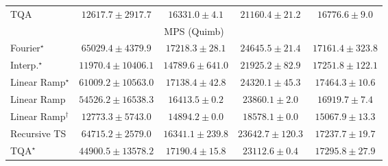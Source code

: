 \begin{tabular}{l|cccc|}
TQA & {\cellcolor[HTML]{D7E5F0}} \color[HTML]{000000} $12617.7\pm 2917.7$ & {\cellcolor[HTML]{CBDCEB}} \color[HTML]{000000} $16331.0\pm 4.1$ & {\cellcolor[HTML]{BCD1E5}} \color[HTML]{000000} $21160.4\pm 21.2$ & {\cellcolor[HTML]{C9DBEA}} \color[HTML]{000000} $16776.6\pm 9.0$ \\
\cline{1-5}
\multicolumn{5}{c}{\rule{0pt}{8pt}MPS (Quimb)} \\
\midrule
Fourier$^\star$ & {\cellcolor[HTML]{B64203}} \color[HTML]{F1F1F1} $65029.4\pm 4379.9$ & {\cellcolor[HTML]{FEE89D}} \color[HTML]{000000} $17218.3\pm 28.1$ & {\cellcolor[HTML]{FED573}} \color[HTML]{000000} $24645.5\pm 21.4$ & {\cellcolor[HTML]{FEE89D}} \color[HTML]{000000} $17161.4\pm 323.8$ \\
Interp.$^\star$ & {\cellcolor[HTML]{FFF3B2}} \color[HTML]{000000} $11970.4\pm 10406.1$ & {\cellcolor[HTML]{FFEEA8}} \color[HTML]{000000} $14789.6\pm 641.0$ & {\cellcolor[HTML]{FEDD84}} \color[HTML]{000000} $21925.2\pm 82.9$ & {\cellcolor[HTML]{FEE89D}} \color[HTML]{000000} $17251.8\pm 122.1$ \\
Linear Ramp$^\star$ & {\cellcolor[HTML]{CB4B02}} \color[HTML]{F1F1F1} $61009.2\pm 10563.0$ & {\cellcolor[HTML]{FEE89D}} \color[HTML]{000000} $17138.4\pm 42.8$ & {\cellcolor[HTML]{FED676}} \color[HTML]{000000} $24320.1\pm 45.3$ & {\cellcolor[HTML]{FEE89B}} \color[HTML]{000000} $17464.3\pm 10.6$ \\
Linear Ramp & {\cellcolor[HTML]{DF620D}} \color[HTML]{F1F1F1} $54526.2\pm 16538.3$ & {\cellcolor[HTML]{FEEAA1}} \color[HTML]{000000} $16413.5\pm 0.2$ & {\cellcolor[HTML]{FED778}} \color[HTML]{000000} $23860.1\pm 2.0$ & {\cellcolor[HTML]{FEE99E}} \color[HTML]{000000} $16919.7\pm 7.4$ \\
Linear Ramp$^\dagger$ & {\cellcolor[HTML]{FFF1B0}} \color[HTML]{000000} $12773.3\pm 5743.0$ & {\cellcolor[HTML]{FEEDA6}} \color[HTML]{000000} $14894.2\pm 0.0$ & {\cellcolor[HTML]{FEE697}} \color[HTML]{000000} $18578.1\pm 0.0$ & {\cellcolor[HTML]{FEEDA6}} \color[HTML]{000000} $15067.9\pm 13.3$ \\
Recursive TS & {\cellcolor[HTML]{B84203}} \color[HTML]{F1F1F1} $64715.2\pm 2579.0$ & {\cellcolor[HTML]{FEEAA1}} \color[HTML]{000000} $16341.1\pm 239.8$ & {\cellcolor[HTML]{FED87A}} \color[HTML]{000000} $23642.7\pm 120.3$ & {\cellcolor[HTML]{FEE89D}} \color[HTML]{000000} $17237.7\pm 19.7$ \\
TQA$^\star$ & {\cellcolor[HTML]{F6861F}} \color[HTML]{F1F1F1} $44900.5\pm 13578.2$ & {\cellcolor[HTML]{FEE89D}} \color[HTML]{000000} $17190.4\pm 15.8$ & {\cellcolor[HTML]{FEDA7E}} \color[HTML]{000000} $23112.6\pm 0.4$ & {\cellcolor[HTML]{FEE89D}} \color[HTML]{000000} $17295.8\pm 27.9$ \\

\end{tabular}
